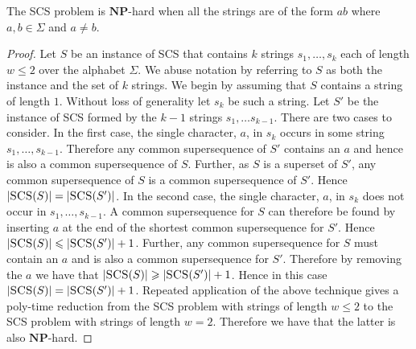 \documentclass[a4paper,11pt]{llncs}
\newcounter{l}
\renewcommand{\geq}{\geqslant}
\renewcommand{\leq}{\leqslant}
\newcommand{\NPtime}{\ensuremath{\mathbf{NP}}}
\newcommand{\SCS}{\textsc{SCS}}
\begin{document}
\begin{lemma}
    \label{lem:SCSab}
    The \SCS{} problem is \NPtime-hard when all the strings are of the form $ab$ where $a,b \in \Sigma$ and $a \neq b$.
\end{lemma}
\begin{proof}
Let $S$ be an instance of \SCS{} that contains $k$ strings $s_1,\ldots,s_k$ each of length $w\leq 2$ over the alphabet $\Sigma$. We abuse notation by referring to $S$ as both the instance and the set of $k$ strings. We begin by assuming that $S$ contains a string of length $1$. Without loss of generality let $s_k$ be such a string. Let $S'$ be the instance of \SCS{} formed by the $k-1$ strings $s_1,\ldots s_{k-1}$. There are two cases to consider. In the first case, the single character, $a$, in $s_k$ occurs in some string $s_1,\ldots,s_{k-1}$. Therefore any common supersequence of $S'$ contains an $a$ and hence is also a common supersequence of $S$. Further, as $S$ is a superset of $S'$, any common supersequence of $S$ is a common supersequence of $S'$. Hence $|\SCS{}(S)|=|\SCS{}(S')|$. In the second case, the single character, $a$, in $s_k$ does not occur in $s_1,\ldots,s_{k-1}$. A common supersequence for $S$ can therefore be found by inserting $a$ at the end of the shortest common supersequence for $S'$. Hence $|\SCS{}(S)|\leq |\SCS{}(S')|+1$. Further, any common supersequence for $S$ must contain an $a$ and is also a common supersequence for $S'$. Therefore by removing the $a$ we have that $|\SCS{}(S)|\geq |\SCS{}(S')|+1$. Hence in this case $|\SCS{}(S)| = |\SCS{}(S')|+1$. Repeated application of the above technique gives a poly-time reduction from the \SCS{} problem with strings of length $w \leq 2$ to  the \SCS{} problem with strings of length $w = 2$. Therefore we have that the latter is also \NPtime-hard.


\end{proof}
\end{document}
